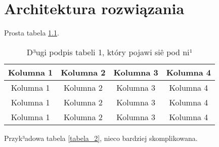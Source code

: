 \chapter{Architektura rozwiązania}

Prosta tabela \ref{tabela_1}.

\begin{table}[htb]
\centering
\begin{tabular}{|c|c|c|c|}
\hline
Kolumna 1 & Kolumna 2 & Kolumna 3 & Kolumna 4 \\\hline
Kolumna 1 & Kolumna 2 & Kolumna 3 & Kolumna 4 \\\hline
Kolumna 1 & Kolumna 2 & Kolumna 3 & Kolumna 4 \\\hline
Kolumna 1 & Kolumna 2 & Kolumna 3 & Kolumna 4 \\\hline
\end{tabular}
\caption[Krótki podpis tabeli 1 -- do spisu treci]{D³ugi podpis tabeli 1, który pojawi siê pod ni¹}
\label{tabela_1}
\end{table}

Przyk³adowa tabela \ref{tabela_2}, nieco bardziej skomplikowana.

